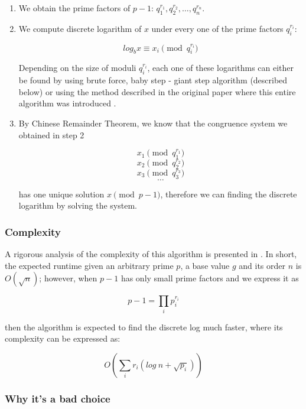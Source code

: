 \documentclass{article}
\begin{document}
      \begin{enumerate}

        \item We obtain the prime factors of $p-1$: $q_1^{r_1}, q_2^{r_2}, \ldots, q_n^{r_n}$.

        \item We compute discrete logarithm of $x$ under every one of the prime factors $q_i^{r_i}$:

          $$log_b x \equiv x_i \pmod{q_i^{r_i}}$$

          Depending on the size of moduli $q_i^{r_i}$, each one of these logarithms can either be found by using brute force, baby step - giant step algorithm (described below) or using the method described in the original paper where this entire algorithm was introduced \autocite{Pohlig2006}.

        \item By Chinese Remainder Theorem, we know that the congruence system we obtained in step 2

          $$x_1 \pmod{q_1^{r_1}}$$
          $$x_2 \pmod{q_2^{r_2}}$$
          $$x_3 \pmod{q_3^{r_3}}$$
          $$\ldots$$

          has one unique solution $x \pmod{p-1}$, therefore we can finding the discrete logarithm by solving the system.

      \end{enumerate}

      \subsubsection{Complexity}

      A rigorous analysis of the complexity of this algorithm is presented in \autocite{Pohlig2006}. In short, the expected runtime given an arbitrary prime $p$, a base value $g$ and its order $n$ is $O(\sqrt{n})$; however, when $p-1$ has only small prime factors and we express it as

      $$p-1 = \prod_{i} {p_i^{r_i}}$$

      then the algorithm is expected to find the discrete log much faster, where its complexity can be expressed as:

      $$O\left( \sum_{i} {r_i(log\ n + \sqrt{p_i})} \right)$$

      \subsubsection{Why it's a bad choice}
\end{document}
